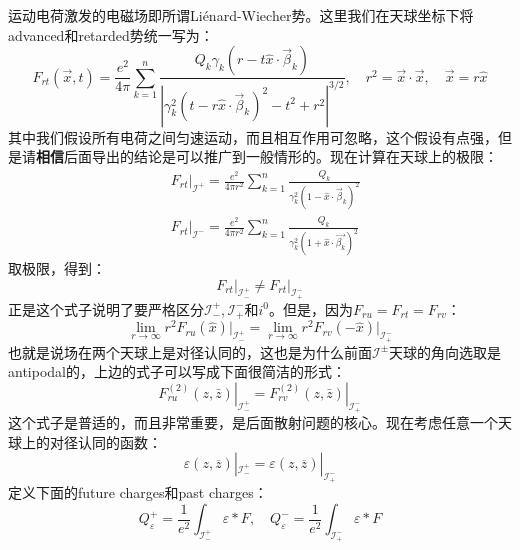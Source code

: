 运动电荷激发的电磁场即所谓Li\'enard\mbox{-}Wiecher势\cite{Jackson1998ClassicalE3}。这里我们在天球坐标下将advanced和retarded势统一写为：
\begin{equation}
	F_{rt}(\vec{x},t)=\frac{e^2}{4\pi}\sum_{k=1}^n\frac{Q_k\gamma_k\left(r-t\hat{x}\cdot\vec{\beta}_k\right)}{\left|\gamma_k^2\left(t-r\hat{x}\cdot\vec{\beta}_k\right)^2-t^2+r^2\right|^{3/2}},\quad r^2=\vec{x}\cdot\vec{x},\quad\vec{x}=r\hat{x}
\end{equation}
其中我们假设所有电荷之间匀速运动，而且相互作用可忽略，这个假设有点强，但是请\textbf{相信}后面导出的结论是可以推广到一般情形的。现在计算在天球上的极限：
\begin{equation}
	\begin{aligned}
		&\left.F_{rt}\right|_{\mathcal{I}^{+}}=\frac{e^{2}}{4\pi r^{2}}\sum_{k=1}^{n}\frac{Q_{k}}{\gamma_{k}^{2}(1-\hat{x}\cdot\vec{\beta}_{k})^{2}}\\
		&\left.F_{rt}\right|_{\mathcal{I}^{-}}=\frac{e^{2}}{4\pi r^{2}}\sum_{k=1}^{n}\frac{Q_{k}}{\gamma_{k}^{2}(1+\hat{x}\cdot\vec{\beta_{k}})^{2}}
	\end{aligned}
\end{equation}
取极限，得到：
\begin{equation}
	\boxed{
	\left.F_{rt}\right|_{\mathcal{I}^{+}_-}\neq \left.F_{rt}\right|_{\mathcal{I}^{-}_+}}
\end{equation}
正是这个式子说明了要严格区分$\mathcal{I}^{+}_-,\mathcal{I}^{-}_{+}$和$i^0$。但是，因为$F_{ru}=F_{rt}=F_{rv}$：
\begin{equation}
	\boxed{
		\lim\limits_{r\to\infty}r^2F_{ru}(\hat{x})\Big|_{\mathcal{I}_{-}^+}=\lim\limits_{r\to\infty}r^2F_{rv}(-\hat{x})\Big|_{\mathcal{I}_{+}^-}
	}
\end{equation}
也就是说场在两个天球上是对径认同的，这也是为什么前面$\mathcal{I}^{\pm}$天球的角向选取是antipodal的，上边的式子可以写成下面很简洁的形式：
\begin{equation}
	\boxed{
	\left.F_{ru}^{(2)}(z,\bar z)\right|_{\mathcal{I}^{+}_-}=\left.F_{rv}^{(2)}(z,\bar z)\right|_{\mathcal{I}^{-}_+}
	}
\end{equation}
这个式子是普适的，而且非常重要，是后面散射问题的核心。现在考虑任意一个天球上的对径认同的函数：
\begin{equation}
	\varepsilon(z,\overline{z})|_{\mathcal{I}_{-}^{+}}=\varepsilon(z,\overline{z})|_{\mathcal{I}_{+}^{-}}
\end{equation}
定义下面的future charges和past charges：
\begin{equation}
	\boxed{
		Q_{\varepsilon}^{+}=\frac{1}{e^{2}}\int_{\mathcal I_{-}^{+}}\varepsilon*F,\quad Q_{\varepsilon}^{-}=\frac{1}{e^{2}}\int_{\mathcal I_{+}^{-}}\varepsilon*F
	}
\end{equation}

